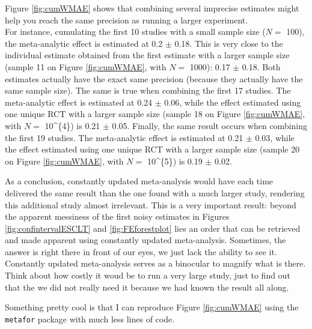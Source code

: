 \documentclass[]{book}
\newenvironment{Shaded}{\begin{snugshade}}{\end{snugshade}}
\newcommand{\KeywordTok}[1]{\textcolor[rgb]{0.13,0.29,0.53}{\textbf{#1}}}
\newcommand{\DataTypeTok}[1]{\textcolor[rgb]{0.13,0.29,0.53}{#1}}
\newcommand{\StringTok}[1]{\textcolor[rgb]{0.31,0.60,0.02}{#1}}
\newcommand{\OperatorTok}[1]{\textcolor[rgb]{0.81,0.36,0.00}{\textbf{#1}}}
\newcommand{\NormalTok}[1]{#1}
\theoremstyle{definition}
\theoremstyle{definition}
\theoremstyle{definition}
\theoremstyle{remark}
\let\BeginKnitrBlock\begin \let\EndKnitrBlock\end
\begin{document}
Figure \ref{fig:cumWMAE} shows that combining several imprecise
estimates might help you reach the same precision as running a larger
experiment.\\
For instance, cumulating the first 10 studies with a small sample size
(\(N=\) 100), the meta-analytic effect is estimated at 0.2 \(\pm\) 0.18.
This is very close to the individual estimate obtained from the first
estimate with a larger sample size (sample 11 on Figure
\ref{fig:cumWMAE}, with \(N=\) 1000): 0.17 \(\pm\) 0.18. Both estimates
actually have the exact same precision (because they actually have the
same sample size). The same is true when combining the first 17 studies.
The meta-analytic effect is estimated at 0.24 \(\pm\) 0.06, while the
effect estimated using one unique RCT with a larger sample size (sample
18 on Figure \ref{fig:cumWMAE}, with \(N=\) 10\^{}\{4\}) is 0.21 \(\pm\)
0.05. Finally, the same result occurs when combining the first 19
studies. The meta-analytic effect is estimated at 0.21 \(\pm\) 0.03,
while the effect estimated using one unique RCT with a larger sample
size (sample 20 on Figure \ref{fig:cumWMAE}, with \(N=\) 10\^{}\{5\}) is
0.19 \(\pm\) 0.02.

As a conclusion, constantly updated meta-analysis would have each time
delivered the same result than the one found with a much larger study,
rendering this additional study almost irrelevant. This is a very
important result: beyond the apparent messiness of the first noisy
estimates in Figures \ref{fig:confintervalESCLT} and
\ref{fig:FEforestplot} lies an order that can be retrieved and made
apparent using constantly updated meta-analysis. Sometimes, the answer
is right there in front of our eyes, we just lack the ability to see it.
Constantly updated meta-analysis serves as a binocular to magnify what
is there. Think about how costly it woud be to run a very large study,
just to find out that the we did not really need it because we had known
the result all along.

\BeginKnitrBlock{remark}
\iffalse{} {Remark. } \fi{}Something pretty cool is that I can reproduce
Figure \ref{fig:cumWMAE} using the \texttt{metafor} package with much
less lines of code.
\EndKnitrBlock{remark}

\begin{Shaded}
\end{Shaded}
\end{document}
